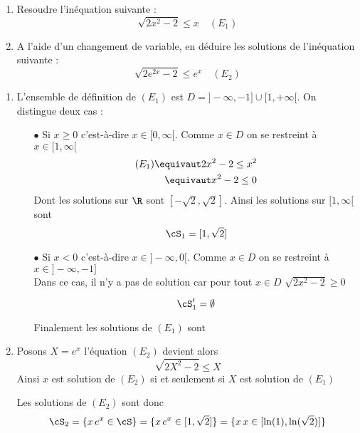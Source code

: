 \documentclass[a4paper, 11pt,reqno]{article}
\begin{document}
\begin{exercice}
\begin{enumerate}
\item Resoudre l'inéquation suivante : 
$$\sqrt{2x^2-2} \leq x \quad (E_1)$$

\item A l'aide d'un changement de variable, en déduire les solutions de  l'inéquation suivante :
$$\sqrt{2e^{2x}-2} \leq e^x \quad (E_2)$$

\end{enumerate}


\end{exercice}
\begin{correction}
\begin{enumerate}



\item L'ensemble de définition de $(E_1) $ est $D=]-\infty,-1]\cup [1,+\infty[$. 
On distingue deux cas :
\begin{itemize}
\item[$\bullet$] Si $x\geq 0$ c'est-à-dire $x\in [0,\infty[$. Comme $x\in D$ on se restreint  à $x\in [1,\infty[$  \\
\begin{align*}
(E_1) \equivaut 2x^2 -2 \leq x^2\\
\equivaut x^2 -2 \leq 0
\end{align*}
Dont les solutions sur $\R$ sont $[-\sqrt{2}, \sqrt{2}]$. Ainsi les solutions sur  $[1,\infty[$   sont 
$$\cS_1 = [1,\sqrt{2}]$$

\item[$\bullet$] Si $x< 0$ c'est-à-dire $x\in ]-\infty,0[$. Comme $x\in D$ on se restreint  à $x\in]-\infty,-1]$  \\
Dans ce cas, il n'y a pas de solution car pour tout $x\in D$ 
$\sqrt{2x^2-2 } \geq 0$ 

$$\cS'_1 = \emptyset $$

Finalement les solutions de $(E_1)$ sont 
\conclusion{ $\cS = [1,\sqrt{2}]$}

\end{itemize}
 
\item Posons $X=e^x$  l'équation $(E_2)$ devient alors 
$$\sqrt{2X^2 -2} \leq X$$ 
Ainsi $x$ est solution de $(E_2)$ si et seulement si $X$ est solution de $(E_1)$

Les solutions de $(E_2)$ sont donc 
$$\cS_2 = \{ x \, e^x \in \cS\} = \{ x \, e^x \in [1,\sqrt{2}]\}=  \{ x \, x \in [\ln(1),\ln(\sqrt{2})]\} $$



 \end{enumerate}
\end{correction}
\end{document}
